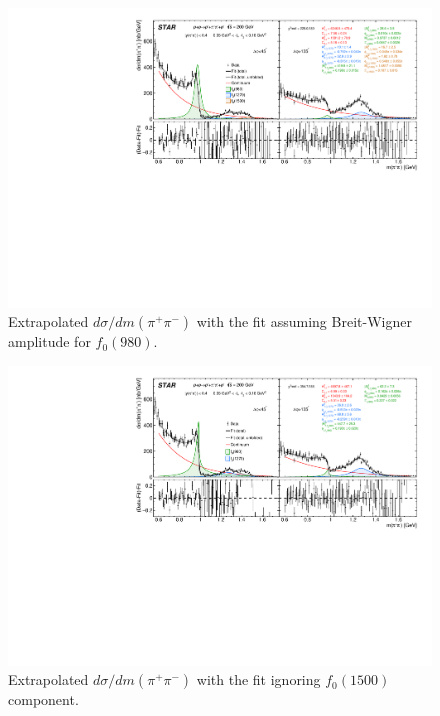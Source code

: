 \begin{figure}%
\centering
\includegraphics[width=\textwidth,page=1]{graphics/physicsResults/InvMassFit/F0980_BREITWIGNER/Ratio_PiPiInvMass_Fit.pdf}
%
\caption{Extrapolated $d\sigma/dm(\pi^{+}\pi^{-})$ with the fit assuming Breit-Wigner amplitude for $f_{0}(980)$.}
\label{invMassFit_F0980_BREITWIGNER}
\end{figure}

\begin{figure}%
\centering
\includegraphics[width=\textwidth,page=1]{graphics/physicsResults/InvMassFit/NO_F01500/Ratio_PiPiInvMass_Fit.pdf}
%
\caption{Extrapolated $d\sigma/dm(\pi^{+}\pi^{-})$ with the fit ignoring $f_{0}(1500)$ component.}
\label{invMassFit_NO_F01500}
\end{figure}

